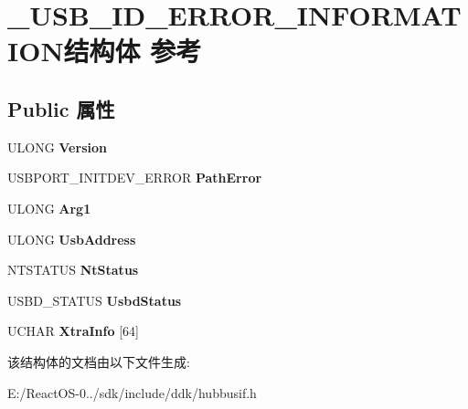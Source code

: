 \hypertarget{struct___u_s_b___i_d___e_r_r_o_r___i_n_f_o_r_m_a_t_i_o_n}{}\section{\+\_\+\+U\+S\+B\+\_\+\+I\+D\+\_\+\+E\+R\+R\+O\+R\+\_\+\+I\+N\+F\+O\+R\+M\+A\+T\+I\+O\+N结构体 参考}
\label{struct___u_s_b___i_d___e_r_r_o_r___i_n_f_o_r_m_a_t_i_o_n}
\subsection*{Public 属性}
\begin{DoxyCompactItemize}
\item 
\mbox{\label{struct___u_s_b___i_d___e_r_r_o_r___i_n_f_o_r_m_a_t_i_o_n_aa4385610f36fafdb9d6948fa40c332de}} 
U\+L\+O\+NG {\bfseries Version}
\item 
\mbox{\label{struct___u_s_b___i_d___e_r_r_o_r___i_n_f_o_r_m_a_t_i_o_n_a93f07c36ec25a14d9e8f4c91b4662a0e}} 
U\+S\+B\+P\+O\+R\+T\+\_\+\+I\+N\+I\+T\+D\+E\+V\+\_\+\+E\+R\+R\+OR {\bfseries Path\+Error}
\item 
\mbox{\label{struct___u_s_b___i_d___e_r_r_o_r___i_n_f_o_r_m_a_t_i_o_n_a6033bfbf5f362ed3bdbcf92b42c20a6d}} 
U\+L\+O\+NG {\bfseries Arg1}
\item 
\mbox{\label{struct___u_s_b___i_d___e_r_r_o_r___i_n_f_o_r_m_a_t_i_o_n_a9c4e42806bd37f00cb6f2343c1d99ca2}} 
U\+L\+O\+NG {\bfseries Usb\+Address}
\item 
\mbox{\label{struct___u_s_b___i_d___e_r_r_o_r___i_n_f_o_r_m_a_t_i_o_n_a6a992d3ad38ebd838528e4c1d5ebab5e}} 
N\+T\+S\+T\+A\+T\+US {\bfseries Nt\+Status}
\item 
\mbox{\label{struct___u_s_b___i_d___e_r_r_o_r___i_n_f_o_r_m_a_t_i_o_n_ae05396fd4ec54903317f8e96d4e94742}} 
U\+S\+B\+D\+\_\+\+S\+T\+A\+T\+US {\bfseries Usbd\+Status}
\item 
\mbox{\label{struct___u_s_b___i_d___e_r_r_o_r___i_n_f_o_r_m_a_t_i_o_n_aefa6a2456606180b086c761217da5341}} 
U\+C\+H\+AR {\bfseries Xtra\+Info} \mbox{[}64\mbox{]}
\end{DoxyCompactItemize}


该结构体的文档由以下文件生成\+:\begin{DoxyCompactItemize}
\item 
E\+:/\+React\+O\+S-\/0../sdk/include/ddk/hubbusif.\+h\end{DoxyCompactItemize}

